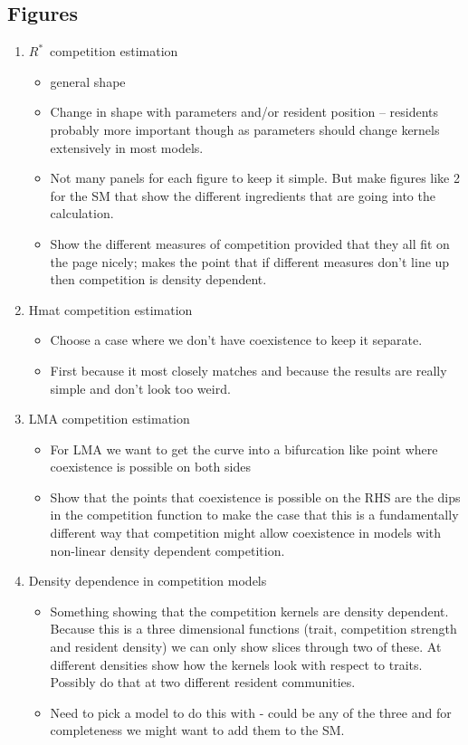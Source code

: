 \documentclass[a4paper,11pt]{article}
\newcommand{\Rstar}{\ensuremath{R^*}}
\begin{document}
\subsection{Figures}


\begin{enumerate}
\item \Rstar\ competition estimation
  \begin{itemize}
  \item general shape
  \item Change in shape with parameters and/or resident position --
    residents probably more important though as parameters should
    change kernels extensively in most models.
  \item Not many panels for each figure to keep it simple.  But make
    figures like 2 for the SM that show the different ingredients that
    are going into the calculation.
  \item Show the different measures of competition provided that they
    all fit on the page nicely; \citet{Abrams-2008} makes the point
    that if different measures don't line up then competition is
    density dependent.
  \end{itemize}
\item Hmat competition estimation
  \begin{itemize}
  \item Choose a case where we don't have coexistence to keep it
    separate.
  \item First because it most closely matches \citet{Kisdi-1999} and
    because the results are really simple and don't look too weird.
  \end{itemize}
\item LMA competition estimation
  \begin{itemize}
  \item For LMA we want to get the curve into a bifurcation like point
    where coexistence is possible on both sides
  \item Show that the points that coexistence is possible on the RHS
    are the dips in the competition function to make the case that
    this is a fundamentally different way that competition might allow
    coexistence in models with non-linear density dependent
    competition.
  \end{itemize}
\item Density dependence in competition models
  \begin{itemize}
  \item Something showing that the competition kernels are density
    dependent.  Because this is a three dimensional functions (trait,
    competition strength and resident density) we can only show slices
    through two of these.  At different densities show how the
    kernels look with respect to traits.  Possibly do that at two
    different resident communities.
  \item Need to pick a model to do this with - could be any of the
    three and for completeness we might want to add them to the SM.
  \end{itemize}
\end{enumerate}
\end{document}
